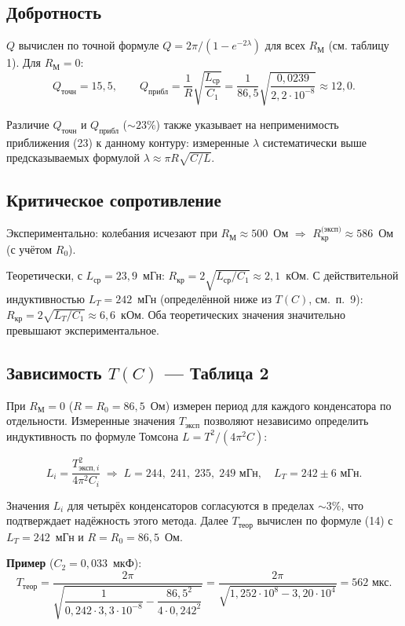 \subsection{Добротность}

$Q$ вычислен по точной формуле $Q = 2\pi/(1 - e^{-2\lambda})$ для всех $R_\text{М}$ (см. таблицу 1). Для $R_\text{М} = 0$:
\[
Q_{\text{точн}} = 15{,}5, \qquad
Q_{\text{прибл}} = \frac{1}{R}\sqrt{\frac{L_\text{ср}}{C_1}} = \frac{1}{86{,}5}\sqrt{\frac{0{,}0239}{2{,}2\cdot10^{-8}}} \approx 12{,}0.
\]

Различие $Q_\text{точн}$ и $Q_\text{прибл}$ ($\sim 23\%$) также указывает на неприменимость приближения (23) к данному контуру: измеренные $\lambda$ систематически выше предсказываемых формулой $\lambda \approx \pi R\sqrt{C/L}$.

\subsection{Критическое сопротивление}

Экспериментально: колебания исчезают при $R_\text{М} \approx 500$~Ом $\Rightarrow$ $R_\text{кр}^\text{(эксп)} \approx 586$~Ом (с учётом $R_0$).

Теоретически, с $L_\text{ср} = 23{,}9$~мГн: $R_\text{кр} = 2\sqrt{L_\text{ср}/C_1} \approx 2{,}1$~кОм. С действительной индуктивностью $L_T = 242$~мГн (определённой ниже из $T(C)$, см.~п.~9): $R_\text{кр} = 2\sqrt{L_T/C_1} \approx 6{,}6$~кОм. Оба теоретических значения значительно превышают экспериментальное.

\subsection{Зависимость $T(C)$ --- Таблица 2}
\label{sec:t_c}

При $R_\text{М} = 0$ ($R = R_0 = 86{,}5$~Ом) измерен период для каждого конденсатора по отдельности. Измеренные значения $T_\text{эксп}$ позволяют независимо определить индуктивность по формуле Томсона $L = T^2/(4\pi^2 C)$:

\[
L_i = \frac{T_{\text{эксп},i}^2}{4\pi^2 C_i} \;\Rightarrow\; L = 244,\; 241,\; 235,\; 249 \text{ мГн}, \quad L_T = 242 \pm 6 \text{ мГн}.
\]

Значения $L_i$ для четырёх конденсаторов согласуются в пределах $\sim 3\%$, что подтверждает надёжность этого метода. Далее $T_\text{теор}$ вычислен по формуле (14) с $L_T = 242$~мГн и $R = R_0 = 86{,}5$~Ом.

\textbf{Пример} ($C_2 = 0{,}033$~мкФ):
\[
T_\text{теор} = \frac{2\pi}{\sqrt{\dfrac{1}{0{,}242 \cdot 3{,}3 \cdot 10^{-8}} - \dfrac{86{,}5^2}{4 \cdot 0{,}242^2}}}
= \frac{2\pi}{\sqrt{1{,}252 \cdot 10^8 - 3{,}20 \cdot 10^4}} = 562 \text{ мкс}.
\]


